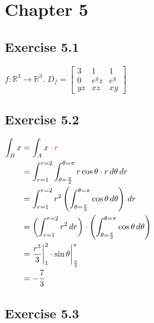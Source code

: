 \section*{Chapter 5}

\subsection*{Exercise 5.1}

$f: \mathbb{R}^3 \to \mathbb{R}^3$. $D_f = \begin{bmatrix} 3 & 1 & 1 \\ 0 & e^yz & e^y \\ yz & xz & xy \end{bmatrix}$

\subsection*{Exercise 5.2}

$\begin{aligned}[t]
    \int_B x
     & = \int_A x \color{red} \cdot r                                                                             \\
     & = \int_{r=1}^{r=2} \int_{\theta=\frac{\pi}{2}}^{\theta=\pi} r \cos{\theta} \cdot r \,d\theta \,dr          \\
     & = \int_{r=1}^{r=2} r^2 \left( \int_{\theta=\frac{\pi}{2}}^{\theta=\pi} \cos{\theta} \,d\theta \right) \,dr \\
     & = \left( \int_{r=1}^{r=2} r^2 \,dr \right) \cdot\left( \int_{\theta=\frac{\pi}{2}}^{\theta=\pi} \cos{\theta} \,d\theta \right) \\
     & = \frac{r^3}{3} \bigg|_1^2 \cdot \sin{\theta} \bigg|_{\frac{\pi}{2}}^\pi                                   \\
     & = -\frac{7}{3}
\end{aligned}$

\subsection*{Exercise 5.3}

